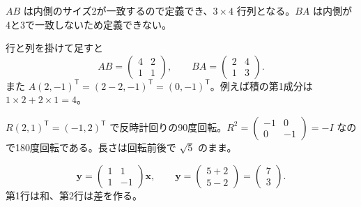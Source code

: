 \documentclass[11pt]{article}
\begin{document}

\problem[サイズの判定]
\begin{ans}
$AB$ は内側のサイズ2が一致するので定義でき、$3\times4$ 行列となる。$BA$ は内側が4と3で一致しないため定義できない。
\end{ans}

\problem[積と非可換性]
\begin{ans}
行と列を掛けて足すと \[AB=\begin{pmatrix}4&2\\1&1\end{pmatrix},\qquad BA=\begin{pmatrix}2&4\\1&3\end{pmatrix}.\] また $A(2,-1)^{\mathsf T}=(2-2,-1)^{\mathsf T}=(0,-1)^{\mathsf T}$。例えば積の第1成分は $1\times2+2\times1=4$。
\end{ans}
\newpage

\problem[回転]
\begin{ans}
$R(2,1)^{\mathsf T}=(-1,2)^{\mathsf T}$ で反時計回りの90度回転。$R^2=\begin{pmatrix}-1&0\\0&-1\end{pmatrix}=-I$ なので180度回転である。長さは回転前後で $\sqrt5$ のまま。
\end{ans}

\problem[センサの出力]
\begin{ans}
\[\boldsymbol y=\begin{pmatrix}1&1\\1&-1\end{pmatrix}\boldsymbol x,\qquad \boldsymbol y=\begin{pmatrix}5+2\\5-2\end{pmatrix}=\begin{pmatrix}7\\3\end{pmatrix}.\] 第1行は和、第2行は差を作る。
\end{ans}
\end{document}
